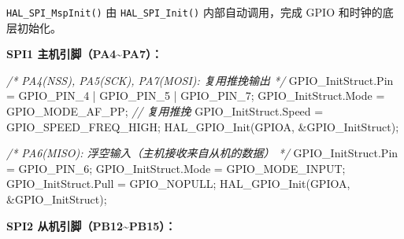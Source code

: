 \documentclass[
  chinese,
  UTF8,
  oneside,
  openany]{ctexbook}
\newenvironment{Shaded}{}{}
\newcommand{\CommentTok}[1]{\textcolor[rgb]{0.38,0.63,0.69}{\textit{#1}}}
\newcommand{\NormalTok}[1]{#1}
\newcommand{\OperatorTok}[1]{\textcolor[rgb]{0.40,0.40,0.40}{#1}}
\begin{document}
\texttt{HAL\_SPI\_MspInit()} 由 \texttt{HAL\_SPI\_Init()}
内部自动调用，完成 GPIO 和时钟的底层初始化。

\textbf{SPI1 主机引脚（PA4\textasciitilde PA7）：}

\begin{Shaded}
\begin{Highlighting}[]
\CommentTok{/* PA4(NSS), PA5(SCK), PA7(MOSI): 复用推挽输出 */}
\NormalTok{GPIO\_InitStruct}\OperatorTok{.}\NormalTok{Pin   }\OperatorTok{=}\NormalTok{ GPIO\_PIN\_4 }\OperatorTok{|}\NormalTok{ GPIO\_PIN\_5 }\OperatorTok{|}\NormalTok{ GPIO\_PIN\_7}\OperatorTok{;}
\NormalTok{GPIO\_InitStruct}\OperatorTok{.}\NormalTok{Mode  }\OperatorTok{=}\NormalTok{ GPIO\_MODE\_AF\_PP}\OperatorTok{;}       \CommentTok{// 复用推挽}
\NormalTok{GPIO\_InitStruct}\OperatorTok{.}\NormalTok{Speed }\OperatorTok{=}\NormalTok{ GPIO\_SPEED\_FREQ\_HIGH}\OperatorTok{;}
\NormalTok{HAL\_GPIO\_Init}\OperatorTok{(}\NormalTok{GPIOA}\OperatorTok{,} \OperatorTok{\&}\NormalTok{GPIO\_InitStruct}\OperatorTok{);}

\CommentTok{/* PA6(MISO): 浮空输入（主机接收来自从机的数据） */}
\NormalTok{GPIO\_InitStruct}\OperatorTok{.}\NormalTok{Pin  }\OperatorTok{=}\NormalTok{ GPIO\_PIN\_6}\OperatorTok{;}
\NormalTok{GPIO\_InitStruct}\OperatorTok{.}\NormalTok{Mode }\OperatorTok{=}\NormalTok{ GPIO\_MODE\_INPUT}\OperatorTok{;}
\NormalTok{GPIO\_InitStruct}\OperatorTok{.}\NormalTok{Pull }\OperatorTok{=}\NormalTok{ GPIO\_NOPULL}\OperatorTok{;}
\NormalTok{HAL\_GPIO\_Init}\OperatorTok{(}\NormalTok{GPIOA}\OperatorTok{,} \OperatorTok{\&}\NormalTok{GPIO\_InitStruct}\OperatorTok{);}
\end{Highlighting}
\end{Shaded}

\textbf{SPI2 从机引脚（PB12\textasciitilde PB15）：}
\end{document}
